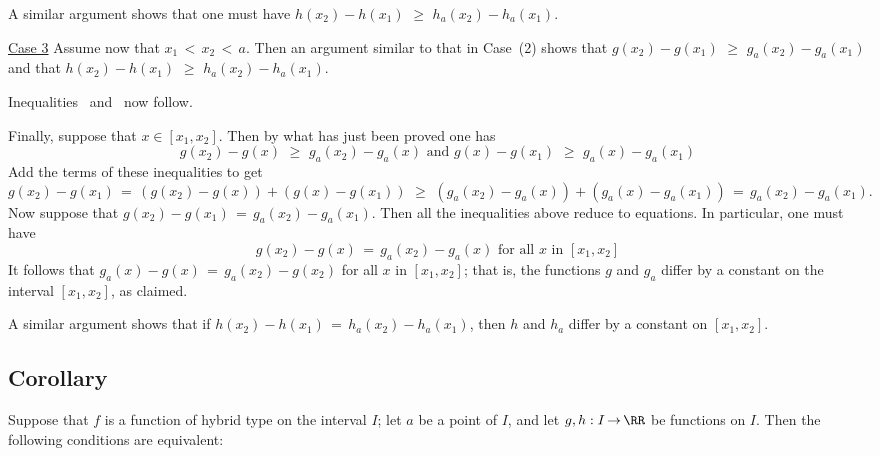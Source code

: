         A similar argument shows that one must have $h(x_{2})-h(x_{1})\,\,{\geq}\,\,h_{a}(x_{2}) - h_{a}(x_{1})$.

        \underline{Case 3} Assume now that $x_{1}\,<\,x_{2}\,<\,a$. Then an argument similar to that in Case~(2) shows that $g(x_{2}) - g(x_{1})\,\,{\geq}\,\,g_{a}(x_{2}) - g_{a}(x_{1})$ and that $h(x_{2}) - h(x_{1})\,\,{\geq}\,\,h_{a}(x_{2})-h_{a}(x_{1})$.

        Inequalities~ and~ now follow.

        Finally, suppose that $x{\in}[x_{1},x_{2}]$. 
    Then by what has just been proved one has
        \begin{displaymath}
        g(x_{2}) - g(x)\,\,{\geq}\,\,g_{a}(x_{2})-g_{a}(x) \mbox{ and } 
        g(x) - g(x_{1})\,\,{\geq}\,\,g_{a}(x)-g_{a}(x_{1})
        \end{displaymath}
    Add the terms of these inequalities to get
        \begin{displaymath}
        g(x_{2}) - g(x_{1}) \,=\, (g(x_{2}) - g(x)) + (g(x) - g(x_{1}))\,\,{\geq}\,\,(g_{a}(x_{2}) - g_{a}(x)) + (g_{a}(x) - g_{a}(x_{1})) \,=\, g_{a}(x_{2}) - g_{a}(x_{1}).
        \end{displaymath}
    Now suppose that $g(x_{2}) - g(x_{1}) \,=\, g_{a}(x_{2}) - g_{a}(x_{1})$.
 Then all the inequalities above reduce to equations.
    In particular, one must have
        \begin{displaymath}
        g(x_{2}) - g(x) \,=\, g_{a}(x_{2}) - g_{a}(x) \mbox{ for all $x$ in $[x_{1},x_{2}]$}
        \end{displaymath}
    It follows that $g_{a}(x) - g(x) \,=\, g_{a}(x_{2}) - g(x_{2})$ for all $x$ in $[x_{1},x_{2}]$;
    that is, the functions $g$ and $g_{a}$ differ by a constant on the interval $[x_{1},x_{2}]$, as claimed.

        A similar argument shows that if $h(x_{2}) - h(x_{1}) \,=\, h_{a}(x_{2}) - h_{a}(x_{1})$, then $h$ and $h_{a}$ differ by a constant on $[x_{1},x_{2}]$.

\V
\V

             \subsection{\small{\bf Corollary}}
            \label{CorF40.140}

        Suppose that $f$ is a function of hybrid type on the interval $I$; let $a$ be a point of $I$, and let $g, h:I \,{\rightarrow}\, {\RR}$ be functions on $I$.
    Then the following conditions are equivalent:

